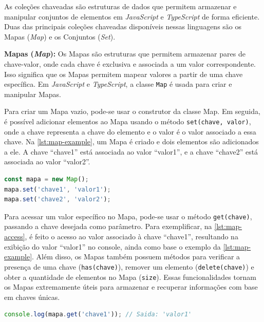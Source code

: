 As coleções chaveadas são estruturas de dados que permitem armazenar e manipular conjuntos de elementos em \textit{JavaScript} e \textit{TypeScript} de forma eficiente. Duas das principais coleções chaveadas disponíveis nessas linguagens são os Mapas (\textit{Map}) e os Conjuntos (\textit{Set}).

\textbf{Mapas (\textit{Map}):} Os Mapas são estruturas que permitem armazenar pares de chave-valor, onde cada chave é exclusiva e associada a um valor correspondente. Isso significa que os Mapas permitem mapear valores a partir de uma chave específica. Em \textit{JavaScript} e \textit{TypeScript}, a classe \texttt{Map} é usada para criar e manipular Mapas.

Para criar um Mapa vazio, pode-se usar o construtor da classe Map. Em seguida, é possível adicionar elementos ao Mapa usando o método \texttt{set(chave, valor)}, onde a chave representa a chave do elemento e o valor é o valor associado a essa chave. Na \autoref{lst:map-example}, um Mapa é criado e dois elementos são adicionados a ele. A chave ``chave1'' está associada ao valor ``valor1'', e a chave ``chave2'' está associada ao valor ``valor2''.

\Needspace{0.3\textheight}
\begin{lstlisting}[language=TypeScript, caption=Exemplo de utilização de Mapa em JS e TS., label=lst:map-example]
const mapa = new Map();
mapa.set('chave1', 'valor1');
mapa.set('chave2', 'valor2');
\end{lstlisting}

Para acessar um valor específico no Mapa, pode-se usar o método \texttt{get(chave)}, passando a chave desejada como parâmetro. Para exemplificar, na \autoref{lst:map-access}, é feito o acesso ao valor associado à chave ``chave1'', resultando na exibição do valor ``valor1'' no console, ainda como base o exemplo da \autoref{lst:map-example}. Além disso, os Mapas também possuem métodos para verificar a presença de uma chave (\texttt{has(chave)}), remover um elemento (\texttt{delete(chave)}) e obter a quantidade de elementos no Mapa (\texttt{size}). Essas funcionalidades tornam os Mapas extremamente úteis para armazenar e recuperar informações com base em chaves únicas.

\begin{lstlisting}[language=TypeScript, caption=Acessando um valor específico em um Mapa., label=lst:map-access]
console.log(mapa.get('chave1')); // Saida: 'valor1'
\end{lstlisting}



